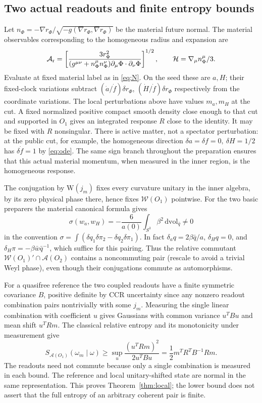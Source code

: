 \documentclass[11pt]{article}
\newcommand{\vol}{\mathrm{dvol}}
\begin{document}
\subsection{Two actual readouts and finite entropy bounds}

Let \(n_\Phi=-\nabla r_\Phi/\sqrt{-g(\nabla r_\Phi,\nabla r_\Phi)}\) be the material future normal. The material observables corresponding to the homogeneous radius and expansion are
\[
 \mathcal A_{\rm r}=
 \left[\frac{3r_\Phi^2}
 {(g^{\mu\nu}+n_\Phi^\mu n_\Phi^\nu)\partial_\mu\Phi\cdot\partial_\nu\Phi}
 \right]^{1/2},\qquad
 \mathcal H=\nabla_\mu n_\Phi^\mu/3 .
\]
Evaluate at fixed material label as in \eqref{eq:N}. On the seed these are \(a,H\); their fixed-clock variations subtract \((\dot a/\dot f)\delta r_\Phi\), \((\dot H/\dot f)\delta r_\Phi\) respectively from the coordinate variations. The local perturbations above have values \(m_a,m_H\) at the cut. A fixed normalized positive compact smooth density close enough to that cut and supported in \(O_1\) gives an integrated response \(R\) close to the identity. It may be fixed with \(R\) nonsingular. There is active matter, not a spectator perturbation: at the public cut, for example, the homogeneous direction \(\delta a=\delta f=0,\ \delta H=1/2\) has \(\delta\dot f=1\) by \eqref{eq:ode}. The same sign branch throughout the preparation ensures that this actual material momentum, when measured in the inner region, is the homogeneous response.

The conjugation by \(\mathrm W(j_m)\) fixes every curvature unitary in the inner algebra, by its zero physical phase there, hence fixes \(\mathcal W(O_1)\) pointwise. For the two basic preparers the material canonical formula gives
\[
 \sigma(w_a,w_H)=-\frac{6}{a(0)}
            \int_{S^3}\beta^2\,\vol_{\bar q}\ne0
\]
in the convention \(\sigma=\int(\delta q_1\delta\pi_2-\delta q_2\delta\pi_1)\). In fact \(\delta_a q=2\beta\bar q/a\), \(\delta_H q=0\), and \(\delta_H\pi=-\beta\bar w\bar q^{-1}\), which suffice for this pairing. Thus the relative commutant \(\mathcal W(O_1)'\cap\mathcal A(O_2)\) contains a noncommuting pair (rescale to avoid a trivial Weyl phase), even though their conjugations commute as automorphisms.

For a quasifree reference the two coupled readouts have a finite symmetric covariance \(B\), positive definite by CCR uncertainty since any nonzero readout combination pairs nontrivially with some \(j_m\). Measuring the single linear combination with coefficient \(u\) gives Gaussians with common variance \(u^TBu\) and mean shift \(u^TRm\). The classical relative entropy and its monotonicity under measurement give
\[
 S_{\mathcal A(O_1)}(\omega_m\mid\omega)\ge
 \sup_u\frac{(u^TRm)^2}{2u^TBu}
 =\frac12 m^TR^TB^{-1}Rm .
\]
The readouts need not commute because only a single combination is measured in each bound. The reference and local unitary-shifted state are normal in the same representation. This proves Theorem~\ref{thm:local}; the lower bound does not assert that the full entropy of an arbitrary coherent pair is finite.
\end{document}
